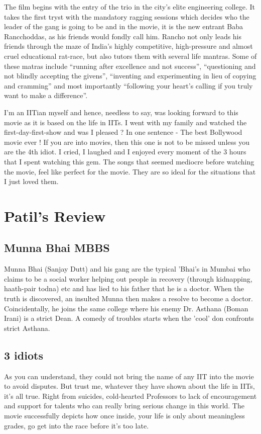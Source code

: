 \documentclass{article}
\begin{document}
The film begins with the entry of the trio in the city's elite engineering college. It takes the first tryst with the mandatory ragging sessions which decides who the leader of the gang is going to be and in the movie, it is the new entrant Baba Rancchoddas, as his friends would fondly call him. Rancho not only leads his friends through the maze of India's highly competitive, high-pressure and almost cruel educational rat-race, but also tutors them with several life mantras. Some of these matras include ``running after excellence and not success'', ``questioning and not blindly accepting the givens'', ``inventing and experimenting in lieu of copying and cramming'' and most importantly ``following your heart's calling if you truly want to make a difference''.


I'm an IITian myself and hence, needless to say, was looking forward to this movie as it is based on the life in IITs. I went with my family and watched the first-day-first-show and was I pleased ? In one sentence - The best Bollywood movie ever ! If you are into movies, then this one is not to be missed unless you are the 4th idiot. I cried, I laughed and I enjoyed every moment of the 3 hours that I spent watching this gem. The songs that seemed mediocre before watching the movie, feel like perfect for the movie. They are so ideal for the situations that I just loved them.

\section{Patil's Review}

\subsection{Munna Bhai MBBS}

 Munna Bhai (Sanjay Dutt) and his gang are the typical 'Bhai's in Mumbai who claims to be a social worker helping out people in recovery (through kidnapping, haath-pair todna) etc and has lied to his father that he is a doctor. When the truth is discovered, an insulted Munna then makes a resolve to become a doctor. Coincidentally, he joins the same college where his enemy Dr. Asthana (Boman Irani) is a strict Dean. A comedy of troubles starts when the 'cool' don confronts strict Asthana.

\subsection{3 idiots}

As you can understand, they could not bring the name of any IIT into the movie to avoid disputes. But trust me, whatever they have shown about the life in IITs, it's all true. Right from suicides, cold-hearted Professors to lack of encouragement and support for talents who can really bring serious change in this world. The movie successfully depicts how once inside, your life is only about meaningless grades, go get into the race before it's too late.
\end{document}
